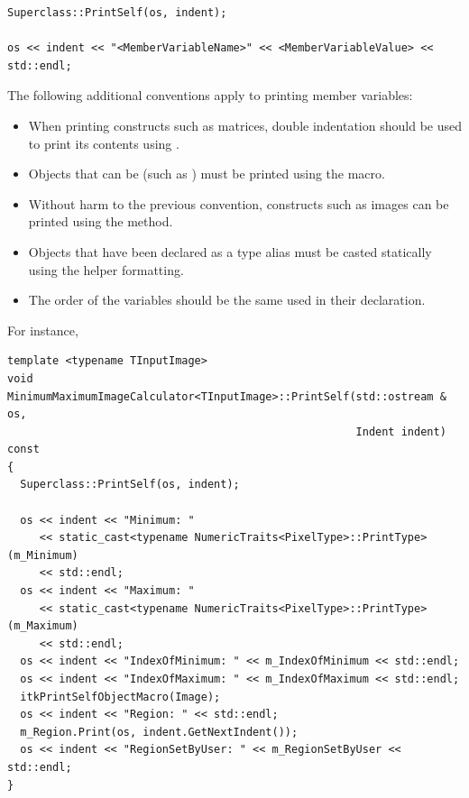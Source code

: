\small
\begin{verbatim}
Superclass::PrintSelf(os, indent);

os << indent << "<MemberVariableName>" << <MemberVariableValue> << std::endl;
\end{verbatim}
\normalsize

The following additional conventions apply to printing member variables:
\begin{itemize}
\item When printing constructs such as matrices, double indentation should be
used to print its contents using .
\item Objects that can be  (such as ) must be
printed using the  macro.
\item Without harm to the previous convention, constructs such as images can
be printed using the  method.
\item Objects that have been declared as a type alias must be casted
statically using the  helper
formatting.
\item The order of the variables should be the same used in their declaration.
\end{itemize}

For instance,

\small
\begin{verbatim}
template <typename TInputImage>
void
MinimumMaximumImageCalculator<TInputImage>::PrintSelf(std::ostream & os,
                                                      Indent indent) const
{
  Superclass::PrintSelf(os, indent);

  os << indent << "Minimum: "
     << static_cast<typename NumericTraits<PixelType>::PrintType>(m_Minimum)
     << std::endl;
  os << indent << "Maximum: "
     << static_cast<typename NumericTraits<PixelType>::PrintType>(m_Maximum)
     << std::endl;
  os << indent << "IndexOfMinimum: " << m_IndexOfMinimum << std::endl;
  os << indent << "IndexOfMaximum: " << m_IndexOfMaximum << std::endl;
  itkPrintSelfObjectMacro(Image);
  os << indent << "Region: " << std::endl;
  m_Region.Print(os, indent.GetNextIndent());
  os << indent << "RegionSetByUser: " << m_RegionSetByUser << std::endl;
}
\end{verbatim}
\normalsize


